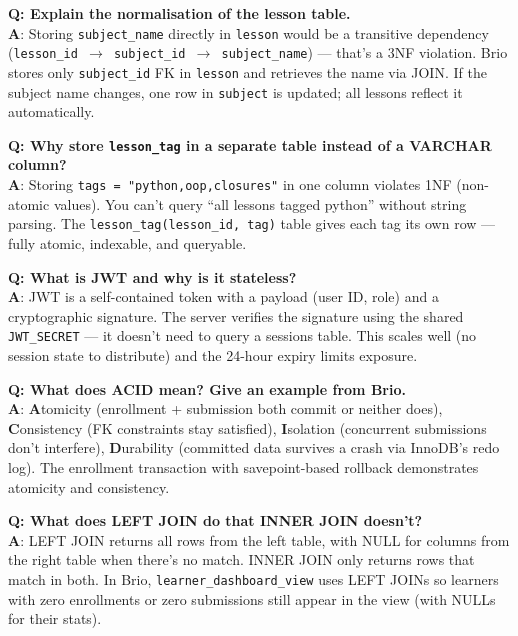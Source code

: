 \documentclass[11pt,a4paper]{article}
\newcommand{\T}[1]{\texttt{#1}}          %
\begin{document}
\begin{qabox}
\textbf{Q: Explain the normalisation of the lesson table.}\\
\textbf{A}: Storing \T{subject\_name} directly in \T{lesson} would be a transitive
dependency (\T{lesson\_id $\to$ subject\_id $\to$ subject\_name}) — that's a 3NF violation.
Brio stores only \T{subject\_id} FK in \T{lesson} and retrieves the name via JOIN.
If the subject name changes, one row in \T{subject} is updated; all lessons reflect
it automatically.
\end{qabox}

\begin{qabox}
\textbf{Q: Why store \T{lesson\_tag} in a separate table instead of a VARCHAR column?}\\
\textbf{A}: Storing \T{tags = "python,oop,closures"} in one column violates 1NF
(non-atomic values). You can't query ``all lessons tagged python'' without string
parsing. The \T{lesson\_tag(lesson\_id, tag)} table gives each tag its own row — fully
atomic, indexable, and queryable.
\end{qabox}

\begin{qabox}
\textbf{Q: What is JWT and why is it stateless?}\\
\textbf{A}: JWT is a self-contained token with a payload (user ID, role) and a
cryptographic signature. The server verifies the signature using the shared
\T{JWT\_SECRET} — it doesn't need to query a sessions table. This scales well
(no session state to distribute) and the 24-hour expiry limits exposure.
\end{qabox}

\begin{qabox}
\textbf{Q: What does ACID mean? Give an example from Brio.}\\
\textbf{A}: \textbf{A}tomicity (enrollment + submission both commit or neither does),
\textbf{C}onsistency (FK constraints stay satisfied), \textbf{I}solation (concurrent
submissions don't interfere), \textbf{D}urability (committed data survives a crash via
InnoDB's redo log). The enrollment transaction with savepoint-based rollback demonstrates
atomicity and consistency.
\end{qabox}

\begin{qabox}
\textbf{Q: What does LEFT JOIN do that INNER JOIN doesn't?}\\
\textbf{A}: LEFT JOIN returns all rows from the left table, with NULL for columns from
the right table when there's no match. INNER JOIN only returns rows that match in both.
In Brio, \T{learner\_dashboard\_view} uses LEFT JOINs so learners with zero enrollments
or zero submissions still appear in the view (with NULLs for their stats).
\end{qabox}
\end{document}
